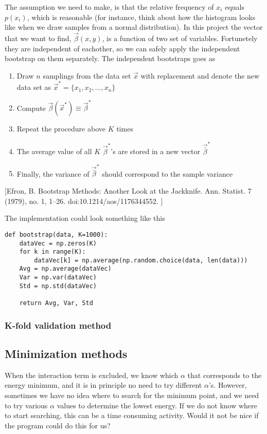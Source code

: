 The assumption we need to make, is that the relative frequency of $x_i$ equals $p(x_i)$, which is reasonable (for instance, think about how the histogram looks like when we draw samples from a normal distribution). In this project the vector that we want to find, $\vec{\beta}(x,y)$, is a function of two set of variables. Fortunetely they are independent of eachother, so we can safely apply the independent bootstrap on them separately. The independent bootstraps goes as
\begin{enumerate}
\item Draw $n$ samplings from the data set $\vec{x}$ with replacement and denote the new data set as $\vec{x}^*=\{x_1,x_2,\hdots,x_n\}$
\item Compute $\vec{\beta}(\vec{x}^*)\equiv\vec{\beta}^*$
\item Repeat the procedure above $K$ times
\item The average value of all $K$ $\vec{\beta}^*$'s are stored in a new vector $\vec{\bar{\beta}}^*$
\item Finally, the variance of $\vec{\bar{\beta}}^*$ should correspond to the sample variance
\end{enumerate}
\cite{BootstrapEfron}
[Efron, B. Bootstrap Methods: Another Look at the Jackknife. Ann. Statist. 7 (1979), no. 1, 1--26. doi:10.1214/aos/1176344552. ]

The implementation could look something like this
\lstset{basicstyle=\scriptsize}
\begin{lstlisting}
def bootstrap(data, K=1000):
    dataVec = np.zeros(K)
    for k in range(K):
        dataVec[k] = np.average(np.random.choice(data, len(data)))
    Avg = np.average(dataVec)
    Var = np.var(dataVec)
    Std = np.std(dataVec)
    
    return Avg, Var, Std
\end{lstlisting}

\subsubsection{K-fold validation method} \label{sec:kfold}


\subsection{Minimization methods} \label{sec:minimization}
When the interaction term is excluded, we know which $\alpha$ that corresponds to the energy minimum, and it is in principle no need to try different $\alpha$'s. However, sometimes we have no idea where to search for the minimum point, and we need to try various $\alpha$ values to determine the lowest energy. If we do not know where to start searching, this can be a time consuming activity. Would it not be nice if the program could do this for us?

